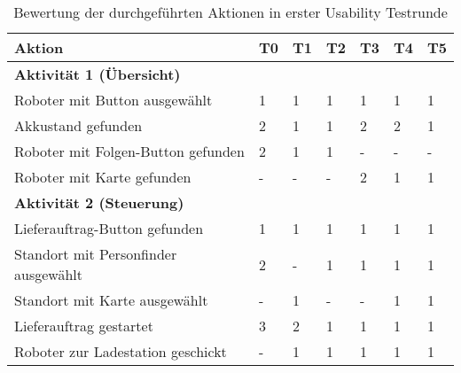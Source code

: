 \begin{table}[H]
    \caption{Bewertung der durchgeführten Aktionen in erster Usability Testrunde}\label{tbl:1stUsabilityTestsActions}
    \begin{tabular}{l|llllll}
        Aktion                              & T0        & T1        & T2        & T3        & T4        & T5        \\ \hline
        \textbf{Aktivität 1 (Übersicht)}    &           &           &           &           &           &           \\
        Roboter mit Button ausgewählt       &         1 &         1 &         1 &         1 &         1 &         1 \\
        Akkustand gefunden                  &         2 &         1 &         1 &         2 &         2 &         1 \\
        Roboter mit Folgen-Button gefunden  &         2 &         1 &         1 &         - &         - &         - \\
        Roboter mit Karte gefunden          &         - &         - &         - &         2 &         1 &         1 \\ \hline

        \textbf{Aktivität 2 (Steuerung)}    &           &           &           &           &           &           \\
        Lieferauftrag-Button gefunden       &         1 &         1 &         1 &         1 &         1 &         1 \\
        Standort mit Personfinder ausgewählt&         2 &         - &         1 &         1 &         1 &         1 \\
        Standort mit Karte ausgewählt       &         - &         1 &         - &         - &         1 &         1 \\
        Lieferauftrag gestartet             &         3 &         2 &         1 &         1 &         1 &         1 \\
        Roboter zur Ladestation geschickt   &         - &         1 &         1 &         1 &         1 &         1 \\ \hline


\end{tabular}
\end{table}
